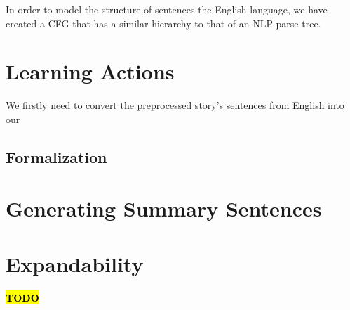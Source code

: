 In order to model the structure of sentences the English language, we have created a CFG that has a similar hierarchy to that of an NLP parse tree.

\section{Learning Actions}

We firstly need to convert the preprocessed story's sentences from English into our 

\subsection{Formalization}

\section{Generating Summary Sentences}

\section{Expandability}

\textcolor{red}{\textbf{\hl{TODO}}}